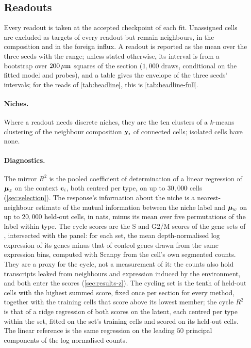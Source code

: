 \subsection{Readouts}
\label{app:readouts}

Every readout is taken at the accepted checkpoint of each fit. Unassigned cells are excluded as targets of every readout but remain neighbours, in the composition and in the foreign influx. A readout is reported as the mean over the three seeds with the range; unless stated otherwise, its interval is from a bootstrap over $200\,\mu\text{m}$ squares of the section ($1{,}000$ draws, conditional on the fitted model and probes), and a table gives the envelope of the three seeds' intervals; for the reads of \cref{tab:headline}, this is \cref{tab:headline-full}.



\paragraph{Niches.} Where a readout needs discrete niches, they are the ten clusters of a $k$-means clustering of the neighbour composition $\mathbf{y}_i$ of connected cells; isolated cells have none.

\paragraph{Diagnostics.} The mirror $R^2$ is the pooled coefficient of determination of a linear regression of $\boldsymbol{\mu}_z$ on the context $\mathbf{c}_i$, both centred per type, on up to $30{,}000$ cells (\cref{sec:selection}). The response's information about the niche is a nearest-neighbour estimate \citep{ross2014} of the mutual information between the niche label and $\boldsymbol{\mu}_w$ on up to $20{,}000$ held-out cells, in nats, minus its mean over five permutations of the label within type. The cycle scores are the S and G2/M scores of the gene sets of \citet{tirosh2016}, intersected with the panel: for each set, the mean depth-normalised log expression of its genes minus that of control genes drawn from the same expression bins, computed with Scanpy \citep{wolf2018} from the cell's own segmented counts. They are a proxy for the cycle, not a measurement of it: the counts also hold transcripts leaked from neighbours and expression induced by the environment, and both enter the scores (\cref{sec:results-z}). The cycling set is the tenth of held-out cells with the highest summed score, fixed once per section for every method, together with the training cells that score above its lowest member; the cycle $R^2$ is that of a ridge regression of both scores on the latent, each centred per type within the set, fitted on the set's training cells and scored on its held-out cells. The linear reference is the same regression on the leading $50$ principal components of the log-normalised counts.


